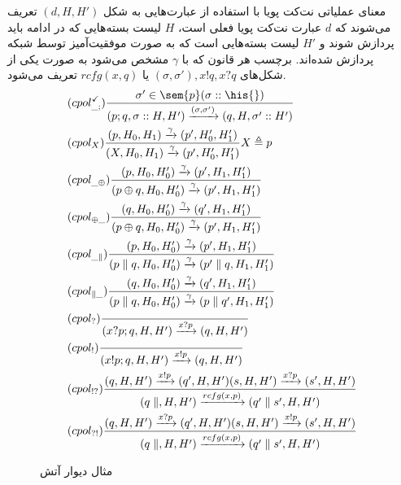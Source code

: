 معنای عملیاتی نت‌کت پویا با استفاده از عبارت‌هایی به شکل
$(d,H,H')$
تعریف می‌شوند که
$d$
عبارت نت‌کت‌ پویا فعلی است،
$H$
لیست بسته‌هایی که در ادامه باید پردازش شوند
و
$H'$
لیست بسته‌هایی است که به صورت موفقیت‌آمیز توسط شبکه پردازش شده‌اند.
برچسب هر قانون که با
$\gamma$
مشخص می‌شود به صورت یکی از شکل‌های
$(\sigma,\sigma'),x!q,x?q$
یا
$rcfg(x,q)$
تعریف می‌شود.
\begin{align}
     & (cpol^{\checkmark}_{\_;})
    \frac{\sigma' \in \sem{p}(\sigma::\his{})}
    {(p;q,\sigma::H,H')\xrightarrow{(\sigma,\sigma')}
    (q,H,\sigma'::H') }                                     \\
     & (cpol_X)
    \frac{(p,H_0,H_1)\xrightarrow{\gamma}(p',H_0',H_1')}
    {(X,H_0,H_1)\xrightarrow{\gamma}(p',H_0',H_1')}
    X \triangleq p                                          \\
     & (cpol_{\_\oplus})
    \frac{(p,H_0,H_0')\xrightarrow{\gamma}(p',H_1,H_1')}
    {(p\oplus q,H_0,H_0')\xrightarrow{\gamma}(p',H_1,H_1')} \\
     & (cpol_{\oplus\_})
    \frac{(q,H_0,H_0')\xrightarrow{\gamma}(q',H_1,H_1')}
    {(p\oplus q,H_0,H_0')\xrightarrow{\gamma}(p',H_1,H_1')} \\
     & (cpol_{\_\parallel})
    \frac{(p,H_0,H_0')\xrightarrow{\gamma}(p',H_1,H_1')}
    {(p\parallel q,H_0,H_0')\xrightarrow{\gamma}(p' \parallel q,H_1,H_1')}
    \\
     & (cpol_{\parallel\_})
    \frac{(q,H_0,H_0')\xrightarrow{\gamma}(q',H_1,H_1')}
    {(p\parallel q,H_0,H_0')\xrightarrow{\gamma}(p \parallel q',H_1,H_1')}
    \\
     & (cpol_?)
    \frac{}
    {(x?p;q,H,H')\xrightarrow{x?p}(q,H,H')}
    \\
     & (cpol_!)
    \frac{}
    {(x!p;q,H,H')\xrightarrow{x!p}(q,H,H')}
    \\
     & (cpol_{!?})
    \frac{
        (q,H,H') \xrightarrow{x!p}(q',H,H')
        (s,H,H') \xrightarrow{x?p} (s',H,H')
    }{
        (q\parallel,H,H') \xrightarrow{rcfg(x,p)} (q'\parallel s',H,H')
    }                                                       \\
     & (cpol_{?!})
    \frac{
        (q,H,H') \xrightarrow{x?p}(q',H,H')
        (s,H,H') \xrightarrow{x!p} (s',H,H')
    }{
        (q\parallel,H,H') \xrightarrow{rcfg(x,p)} (q'\parallel s',H,H')
    }
\end{align}

\begin{figure}
    \centering
    \caption{مثال دیوار آتش}
    \label{dynetkat:firewall}
\end{figure}

